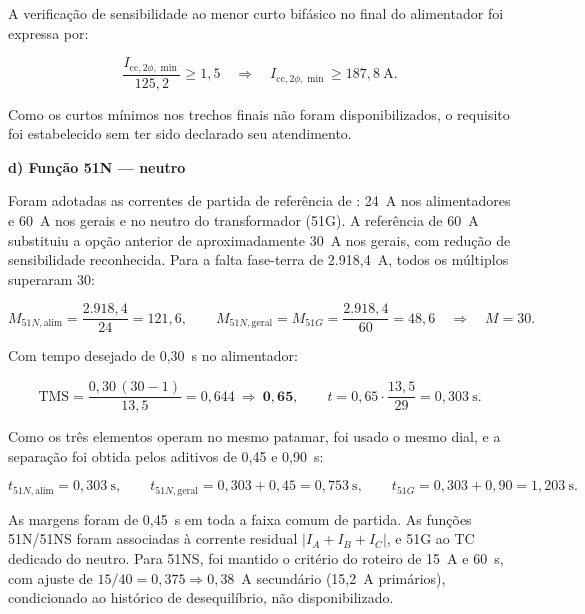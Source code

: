 A verificação de sensibilidade ao menor curto bifásico no final do alimentador foi expressa por:

\begin{equation}
    \frac{I_{\mathrm{cc},2\phi,\min}}{125{,}2}\geq1{,}5
    \quad\Rightarrow\quad I_{\mathrm{cc},2\phi,\min}\geq187{,}8~\mathrm{A}.
    \label{eq:oc_sensibilidade}
\end{equation}

Como os curtos mínimos nos trechos finais não foram disponibilizados, o requisito foi estabelecido sem ter sido declarado seu atendimento.

\textbf{d) Função 51N — neutro}

Foram adotadas as correntes de partida de referência de \cite{cysne2026protecao}: 24~A nos alimentadores e 60~A nos gerais e no neutro do transformador (51G). A referência de 60~A substituiu a opção anterior de aproximadamente 30~A nos gerais, com redução de sensibilidade reconhecida. Para a falta fase-terra de 2.918,4~A, todos os múltiplos superaram 30:

\begin{equation}
    M_{51N,\mathrm{alim}}=\frac{2.918{,}4}{24}=121{,}6,
    \qquad
    M_{51N,\mathrm{geral}}=M_{51G}=\frac{2.918{,}4}{60}=48{,}6
    \quad\Rightarrow\quad M=30.
    \label{eq:oc_multiplos_neutro_memoria}
\end{equation}

Com tempo desejado de 0,30~s no alimentador:

\begin{equation}
    \mathrm{TMS}=\frac{0{,}30\,(30-1)}{13{,}5}=0{,}644
    \ \Rightarrow\ \mathbf{0{,}65},
    \qquad
    t=0{,}65\cdot\frac{13{,}5}{29}=0{,}303~\mathrm{s}.
    \label{eq:oc_dial_neutro_memoria}
\end{equation}

Como os três elementos operam no mesmo patamar, foi usado o mesmo dial, e a separação foi obtida pelos aditivos de 0,45 e 0,90~s:

\begin{equation}
    t_{51N,\mathrm{alim}}=0{,}303~\mathrm{s},
    \qquad
    t_{51N,\mathrm{geral}}=0{,}303+0{,}45=0{,}753~\mathrm{s},
    \qquad
    t_{51G}=0{,}303+0{,}90=1{,}203~\mathrm{s}.
    \label{eq:oc_neutro_patamar}
\end{equation}

As margens foram de 0,45~s em toda a faixa comum de partida. As funções 51N/51NS foram associadas à corrente residual $|I_A+I_B+I_C|$, e 51G ao TC dedicado do neutro. Para 51NS, foi mantido o critério do roteiro de 15~A e 60~s, com ajuste de $15/40=0{,}375\Rightarrow0{,}38$~A secundário (15,2~A primários), condicionado ao histórico de desequilíbrio, não disponibilizado.

